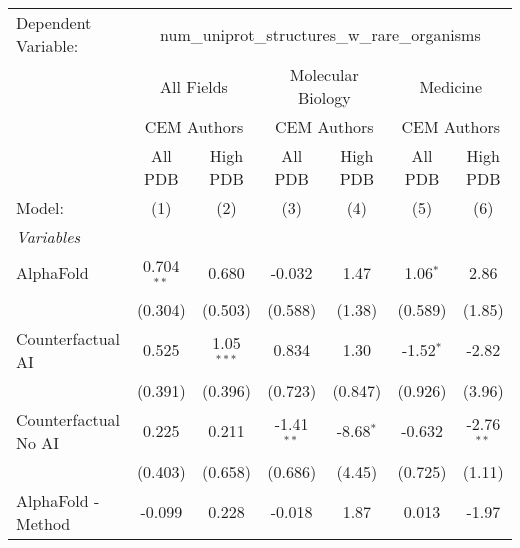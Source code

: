 \begingroup
\centering
\begin{tabular}{lcccccc}
   \tabularnewline \midrule \midrule
   Dependent Variable: & \multicolumn{6}{c}{num\_uniprot\_structures\_w\_rare\_organisms}\\
 & \multicolumn{2}{c}{All Fields} & \multicolumn{2}{c}{Molecular Biology} & \multicolumn{2}{c}{Medicine} \\
\cmidrule(lr){2-3} \cmidrule(lr){4-5} \cmidrule(lr){6-7}
 & \multicolumn{2}{c}{CEM Authors} & \multicolumn{2}{c}{CEM Authors} & \multicolumn{2}{c}{CEM Authors} \\
\cmidrule(lr){2-3} \cmidrule(lr){4-5} \cmidrule(lr){6-7}
 & \multicolumn{1}{c}{All PDB} & \multicolumn{1}{c}{High PDB} & \multicolumn{1}{c}{All PDB} & \multicolumn{1}{c}{High PDB} & \multicolumn{1}{c}{All PDB} & \multicolumn{1}{c}{High PDB} \\
\cmidrule(lr){2-2} \cmidrule(lr){3-3} \cmidrule(lr){4-4} \cmidrule(lr){5-5} \cmidrule(lr){6-6} \cmidrule(lr){7-7}
   Model:                                                     & (1)          & (2)           & (3)           & (4)         & (5)          & (6)\\  
   \midrule
   \emph{Variables}\\
   AlphaFold                                                  & 0.704$^{**}$ & 0.680         & -0.032        & 1.47        & 1.06$^{*}$   & 2.86\\   
                                                              & (0.304)      & (0.503)       & (0.588)       & (1.38)      & (0.589)      & (1.85)\\   
   Counterfactual AI                                          & 0.525        & 1.05$^{***}$  & 0.834         & 1.30        & -1.52$^{*}$  & -2.82\\   
                                                              & (0.391)      & (0.396)       & (0.723)       & (0.847)     & (0.926)      & (3.96)\\   
   Counterfactual No AI                                       & 0.225        & 0.211         & -1.41$^{**}$  & -8.68$^{*}$ & -0.632       & -2.76$^{**}$\\   
                                                              & (0.403)      & (0.658)       & (0.686)       & (4.45)      & (0.725)      & (1.11)\\   
   AlphaFold - Method                                         & -0.099       & 0.228         & -0.018        & 1.87        & 0.013        & -1.97\\   

\end{tabular}
